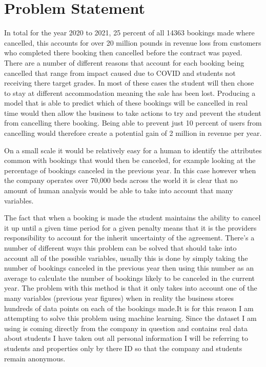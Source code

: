 \section{Problem Statement}

In total for the year 2020 to 2021, 25 percent of all 14363 bookings made where cancelled, this accounts for over 20 million pounds in revenue loss from customers who completed there booking then cancelled before the contract was payed. There are a number of different reasons that account for each booking being cancelled that range from impact caused due to COVID and students not receiving there target grades. In most of these cases the student will then chose to stay at different accommodation meaning the sale has been lost. Producing a model that is able to predict which of these bookings will be cancelled in real time would then allow the business to take actions to try and prevent the student from cancelling there booking. Being able to prevent just 10 percent of users from cancelling would therefore create a potential gain of 2 million in revenue per year.  

\vspace{5mm}

On a small scale it would be relatively easy for a human to identify the attributes common with bookings that would then be canceled, for example looking at the percentage of bookings canceled in the previous year. In this case however when the company operates over 70,000 beds across the world it is clear that no amount of human analysis would be able to take into account that many variables. 

\vspace{5mm}

The fact that when a booking is made the student maintains the ability to cancel it up until a given time period for a given penalty means that it is the providers responsibility to account for the inherit uncertainty of the agreement. There's a number of different ways this problem can be solved that should take into account all of the possible variables, usually this is done by simply taking the number of bookings canceled in the previous year then using this number as an average to calculate the number of bookings likely to be canceled in the current year. The problem with this method is that it only takes into account one of the many variables (previous year figures) when in reality the business stores hundreds of data points on each of the bookings made.It is for this reason I am attempting to solve this problem using machine learning. Since the dataset I am using is coming directly from the company in question and contains real data about students I have taken out all personal information I will be referring to students and properties only by there ID so that the company and students remain anonymous. 
    
